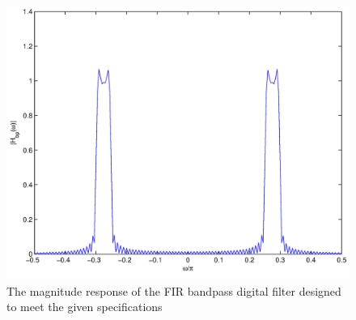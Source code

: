 \documentclass[journal,12pt,twocolumn]{IEEEtran}
\theoremstyle{remark}
\begin{document}
\begin{figure}[htbp] 
\centering
\includegraphics[width=\columnwidth]{figs/PNG/FIR/fig6.png}
\caption{The magnitude response of the FIR bandpass digital filter designed to meet the given specifications}
\label{fig:fig5}
\end{figure}
\end{document}
